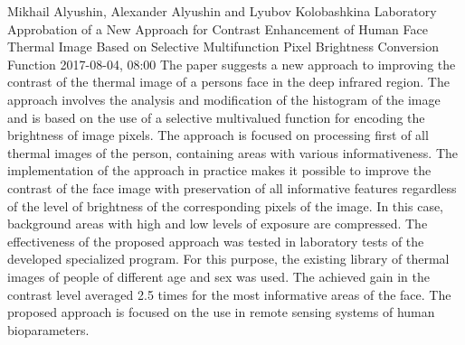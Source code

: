 \documentclass[10pt,fleqn,openany]{book} %
\begin{document}
\begin{enumerate}
		
		\paperabstract
		{Mikhail Alyushin, Alexander Alyushin and Lyubov Kolobashkina}
		{Laboratory Approbation of a New Approach for Contrast Enhancement of Human Face Thermal Image Based on Selective Multifunction Pixel Brightness Conversion Function}
		{2017-08-04, 08:00}
		{The paper suggests a new approach to improving the contrast of the thermal image of a persons face in the deep infrared region. The approach involves the analysis and modification of the histogram of the image and is based on the use of a selective multivalued function for encoding the brightness of image pixels. The approach is focused on processing first of all thermal images of the person, containing areas with various informativeness. The implementation of the approach in practice makes it possible to improve the contrast of the face image with preservation of all informative features regardless of the level of brightness of the corresponding pixels of the image. In this case, background areas with high and low levels of exposure are compressed. The effectiveness of the proposed approach was tested in laboratory tests of the developed specialized program. For this purpose, the existing library of thermal images of people of different age and sex was used. The achieved gain in the contrast level averaged 2.5 times for the most informative areas of the face. The proposed approach is focused on the use in remote sensing systems of human bioparameters.}
		

\end{enumerate}
\end{document}
